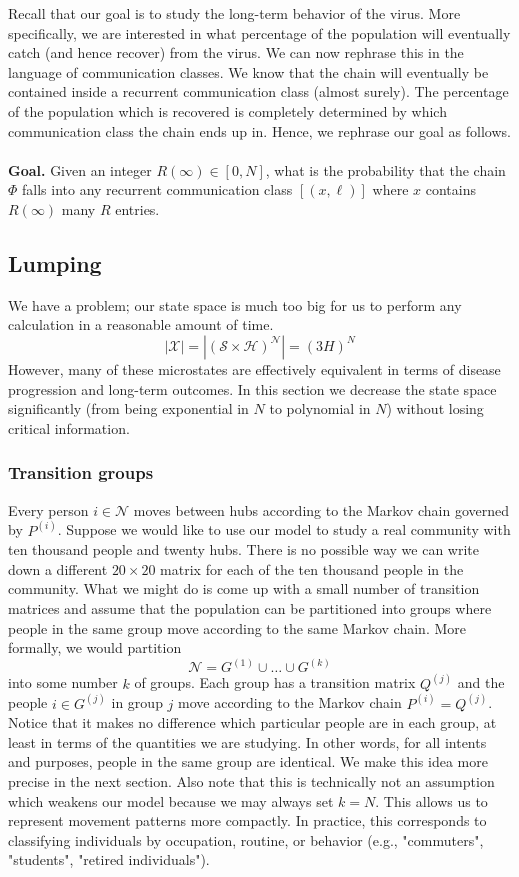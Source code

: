 \documentclass[a4paper]{article}
\begin{document}
	Recall that our goal is to study the long-term behavior of the virus. More specifically, we are interested in what percentage of the population will eventually catch (and hence recover) from the virus. We can now rephrase this in the language of communication classes. We know that the chain will eventually be contained inside a recurrent communication class (almost surely). The percentage of the population which is recovered is completely determined by which communication class the chain ends up in. Hence, we rephrase our goal as follows.\\\\
	\textbf{Goal.} Given an integer $R(\infty) \in [0, N]$, what is the probability that the chain $\Phi$ falls into any recurrent communication class $[(x, \ell)]$ where $x$ contains $R(\infty)$ many $R$ entries.
	\subsection{Lumping}
	We have a problem; our state space is much too big for us to perform any calculation in a reasonable amount of time. 
	$$|\mathcal{X}| = |(\mathcal{S} \times \mathcal{H})^{\mathcal{N}}| = (3H)^{N}$$
	However, many of these microstates are effectively equivalent in terms of disease progression and long-term outcomes. In this section we decrease the state space significantly (from being exponential in $N$ to polynomial in $N$) without losing critical information.
	\subsubsection{Transition groups}
	Every person $i \in \mathcal{N}$ moves between hubs according to the Markov chain governed by $P^{(i)}$. Suppose we would like to use our model to study a real community with ten thousand people and twenty hubs. There is no possible way we can write down a different $20\times20$ matrix for each of the ten thousand people in the community. What we might do is come up with a small number of transition matrices and assume that the population can be partitioned into groups where people in the same group move according to the same Markov chain. More formally, we would partition
	$$\mathcal{N} = G^{(1)} \cup \dots \cup G^{(k)}$$
	into some number $k$ of groups. Each group has a transition matrix $Q^{(j)}$ and the people $i \in G^{(j)}$ in group $j$ move according to the Markov chain $P^{(i)} = Q^{(j)}$. Notice that it makes no difference which particular people are in each group, at least in terms of the quantities we are studying. In other words, for all intents and purposes, people in the same group are identical. We make this idea more precise in the next section. Also note that this is technically not an assumption which weakens our model because we may always set $k = N$. This allows us to represent movement patterns more compactly. In practice, this corresponds to classifying individuals by occupation, routine, or behavior (e.g., "commuters", "students", "retired individuals").
\end{document}
